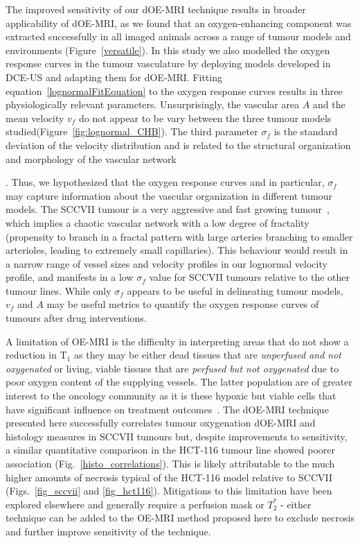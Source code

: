 The improved sensitivity of our \ac{dOE-MRI} technique results in broader applicability of \ac{dOE-MRI}, as we found that an oxygen-enhancing component was extracted successfully in all imaged animals across a range of tumour models and environments (Figure~\ref{versatile}).
In this study we also modelled the oxygen response curves in the tumour vasculature by deploying models developed in \ac{DCE-US} and adapting them for \ac{dOE-MRI}.
Fitting equation~\ref{lognormalFitEquation} to the oxygen response curves results in three physiologically relevant parameters.
Unsurprisingly, the vascular area $A$ and the mean velocity $v_f$ do not appear to be vary between the three tumour models studied(Figure~\ref{fig:lognormal_CHB}).
The third parameter $\sigma_f$ is the standard deviation of the velocity distribution and is related to the structural organization and morphology of the vascular network~{\cite{Hudson:2009jv}.
Thus, we hypothesized that the oxygen response curves and in particular, $\sigma_f$ may capture information about the vascular organization in different tumour models.
The SCCVII tumour is a very aggressive and fast growing tumour~, which implies a chaotic vascular network with a low degree of fractality (propensity to branch in a fractal pattern with large arteries branching to smaller arterioles, leading to extremely small capillaries).
This behaviour would result in a narrow range of vessel sizes and velocity profiles in our lognormal velocity profile,  and manifests in a low $\sigma_f$ value for SCCVII tumours relative to the other tumour lines.
While only $\sigma_f$ appears to be useful in delineating tumour models, $v_f$ and $A$ may be useful metrics to quantify the oxygen response curves of tumours after drug interventions. 
  
A limitation of OE-MRI is the difficulty in interpreting areas that do not show a reduction in T$_1$ as they may be either dead tissues that are \textit{unperfused and not oxygenated} or living, viable tissues that are \textit{perfused but not oxygenated} due to poor oxygen content of the supplying vessels. 
The latter population are of greater interest to the oncology community as it is these hypoxic but viable cells that have significant influence on treatment outcomes~\cite{Horsman:2016go}. 
The \ac{dOE-MRI} technique presented here successfully correlates tumour oxygenation \ac{dOE-MRI} and histology measures in SCCVII tumours but, despite improvements to sensitivity, a similar quantitative comparison in the HCT-116 tumour line showed poorer association (Fig.~\ref{histo_correlations}). 
This is likely attributable to the much higher amounts of necrosis typical of the HCT-116 model relative to SCCVII (Figs.~\ref{fig_sccvii} and \ref{fig_hct116}).
Mitigations to this limitation have been explored elsewhere and generally require a perfusion mask or $T_2^*$ - either technique can be added to the OE-MRI method proposed here to exclude necrosis and further improve sensitivity of the technique.

}
